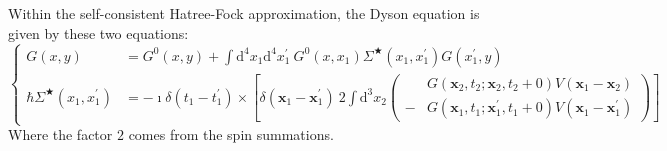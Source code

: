 Within the self-consistent Hatree-Fock approximation, the Dyson equation is given by these two equations:
\[ \left \{ \begin{split}
G(x,y)&= G^{0}(x,y) + \int \mathrm{d}^{4}x_{1} \mathrm{d}^{4}x_{1}^{'} \ G^{0}(x,x_{1}) \Sigma^{\bigstar}%
(x_{1},x_{1}^{'})G(x_{1}^{'},y)\\
\hbar \Sigma^{\bigstar}
(x_{1},x_{1}^{'})&= -\imath \delta(t_{1}-t_{1}^{'}) \times 
\left[ \delta(\mathbf{x}_{1}-\mathbf{x}_{1}^{'}) \ 2 \int \mathrm{d}^{3}x_{2} \left( \begin{split} &G(\mathbf{x}_{2},t_{2};\mathbf{x}_{2},t_{2}+0) V(\mathbf{x}_{1}-\mathbf{x}_{2}) 
\\- &G(\mathbf{x}_{1},t_{1};\mathbf{x}_{1}^{'},t_{1}+0) V(\mathbf{x}_{1}-\mathbf{x}_{1}^{'}) \end{split}\right)
\right]
\end{split}\right. \]
Where the factor $2$ comes from the spin summations.


